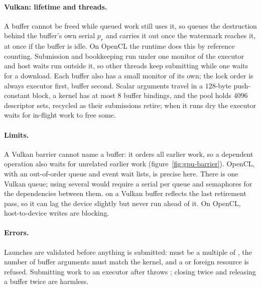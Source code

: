 \documentclass[main.tex]{subfiles}
\begin{document}
    \paragraph{Vulkan: lifetime and threads.}
    A buffer cannot be freed while queued work still uses it, so  queues the destruction behind the buffer's own serial $p_r$ and carries it out once the watermark reaches it, at once if the buffer is idle. On OpenCL the runtime does this by reference counting. Submission and bookkeeping run under one monitor of the executor and host waits run outside it, so other threads keep submitting while one waits for a download. Each buffer also has a small monitor of its own; the lock order is always executor first, buffer second. Scalar arguments travel in a $128$-byte push-constant block, a kernel has at most $8$ buffer bindings, and the pool holds $4096$ descriptor sets, recycled as their submissions retire; when it runs dry the executor waits for in-flight work to free some.

    \paragraph{Limits.}
    A Vulkan barrier cannot name a buffer: it orders all earlier work, so a dependent operation also waits for unrelated earlier work (figure~\ref{fig:gpu-barrier}). OpenCL, with an out-of-order queue and event wait lists, is precise here. There is one Vulkan queue; using several would require a serial per queue and semaphores for the dependencies between them.  on a Vulkan buffer reflects the last retirement pass, so it can lag the device slightly but never run ahead of it. On OpenCL, host-to-device writes are blocking.

    \paragraph{Errors.}
    Launches are validated before anything is submitted:  must be a multiple of , the number of buffer arguments must match the kernel, and a  or foreign resource is refused. Submitting work to an executor after  throws ; closing twice and releasing a buffer twice are harmless.
\end{document}
